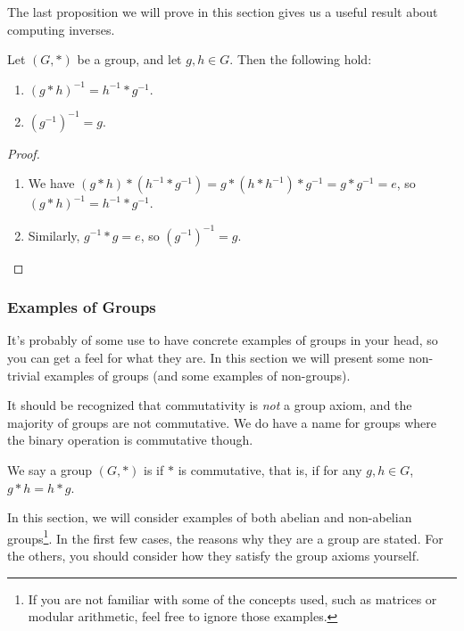 \documentclass[a4paper]{scrartcl}
\begin{document}
The last proposition we will prove in this section gives us a useful result about computing inverses.

\begin{proposition}
	Let $(G, *)$ be a group, and let $g, h \in G$. Then the following hold:
	\begin{enumerate}[label=(\roman*)]
		\item $(g*h)^{-1} = h^{-1} * g^{-1}$.
		\item $(g^{-1})^{-1} = g$.
	\end{enumerate}
\end{proposition}
\begin{proof}$ $\phantom{\qedhere}
	\begin{enumerate}[label=(\roman*)]
		\item We have $(g*h) * (h^{-1} * g^{-1}) =  g * (h * h^{-1}) * g^{-1} = g * g^{-1} = e$, so $(g*h)^{-1} = h^{-1} * g^{-1}$.
		\item Similarly, $g^{-1} * g = e$, so $(g^{-1})^{-1} = g$. \hfill \qedsymbol
	\end{enumerate}
\end{proof}

\subsubsection{Examples of Groups}

It's probably of some use to have concrete examples of groups in your head, so you can get a feel for what they are. In this section we will present some non-trivial examples of groups (and some examples of non-groups).

It should be recognized that commutativity is \emph{not} a group axiom, and the majority of groups are not commutative. We do have a name for groups where the binary operation is commutative though.

\begin{definition}
	We say a group $(G, *)$ is  if $*$ is commutative, that is, if for any $g, h \in G$, $g * h = h * g$.
\end{definition}

In this section, we will consider examples of both abelian and non-abelian groups\footnote{If you are not familiar with some of the concepts used, such as matrices or modular arithmetic, feel free to ignore those examples.}. In the first few cases, the reasons why they are a group are stated. For the others, you should consider how they satisfy the group axioms yourself. 
\end{document}
